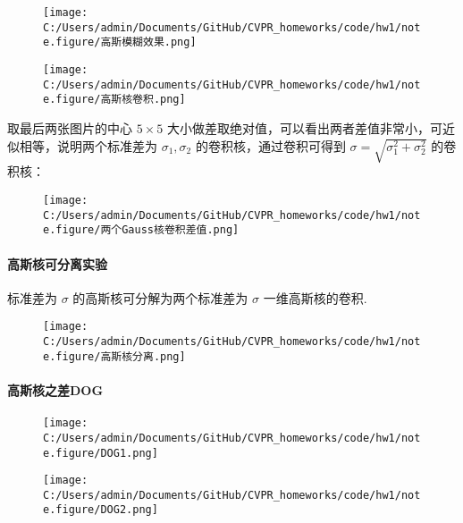 \documentclass[
]{article}
\begin{document}
\begin{figure}
\centering
\texttt{[image: C:/Users/admin/Documents/GitHub/CVPR\_homeworks/code/hw1/note.figure/高斯模糊效果.png]}
\caption{}
\end{figure}

\begin{figure}
\centering
\texttt{[image: C:/Users/admin/Documents/GitHub/CVPR\_homeworks/code/hw1/note.figure/高斯核卷积.png]}
\caption{}
\end{figure}

取最后两张图片的中心 \(5\times 5\)
大小做差取绝对值，可以看出两者差值非常小，可近似相等，说明两个标准差为
\(\sigma_1,\sigma_2\) 的卷积核，通过卷积可得到
\(\sigma = \sqrt{\sigma_1^2+\sigma_2^2}\) 的卷积核：

\begin{figure}
\centering
\texttt{[image: C:/Users/admin/Documents/GitHub/CVPR\_homeworks/code/hw1/note.figure/两个Gauss核卷积差值.png]}
\caption{}
\end{figure}

\hypertarget{ux9ad8ux65afux6838ux53efux5206ux79bbux5b9eux9a8c}{%
\paragraph{高斯核可分离实验}\label{ux9ad8ux65afux6838ux53efux5206ux79bbux5b9eux9a8c}}

标准差为 \(\sigma\) 的高斯核可分解为两个标准差为 \(\sigma\)
一维高斯核的卷积.

\begin{figure}
\centering
\texttt{[image: C:/Users/admin/Documents/GitHub/CVPR\_homeworks/code/hw1/note.figure/高斯核分离.png]}
\caption{}
\end{figure}

\hypertarget{ux9ad8ux65afux6838ux4e4bux5deedog}{%
\paragraph{高斯核之差DOG}\label{ux9ad8ux65afux6838ux4e4bux5deedog}}

\begin{figure}
\centering
\texttt{[image: C:/Users/admin/Documents/GitHub/CVPR\_homeworks/code/hw1/note.figure/DOG1.png]}
\caption{}
\end{figure}

\begin{figure}
\centering
\texttt{[image: C:/Users/admin/Documents/GitHub/CVPR\_homeworks/code/hw1/note.figure/DOG2.png]}
\caption{}
\end{figure}
\end{document}
